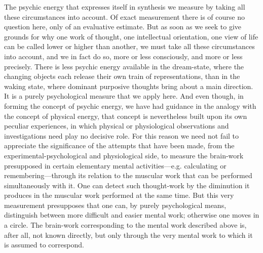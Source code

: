 \documentclass[12pt,a4paper]{book}
\newcommand{\opage}[1]{\marginnote{\footnotesize\textit{[#1]}}}
\begin{document}
The psychic energy that expresses itself in synthesis we measure by
taking all these circumstances into account. Of exact measurement there
is of course no question here, only of an evaluative estimate. But as
soon as we seek to give grounds for why one work of thought, one
intellectual orientation, one view of life can be called lower or higher
than another, we must take all these circumstances into account, and we
in fact do so, more or less consciously, and more or less precisely.
There is less psychic energy available in the dream-state, where the
changing objects each release their own train of representations, than
in the waking state, where dominant purposive thoughts bring about a
main direction. It is a purely psychological measure that we apply here.
And even though, in forming the concept of psychic energy, we have had
guidance in the analogy with the concept of physical energy, that
concept is nevertheless built upon its own peculiar experiences, in
which physical or physiological observations and investigations need
play no decisive role. For this reason we need not fail to appreciate
the significance of the attempts that have been made, from the
experimental-psychological and physiological side, to measure the
brain-work presupposed in certain elementary mental activities---e.g.
calculating or remembering---through its relation to the muscular work
that can be performed simultaneously with it. One can detect such
thought-work by the diminution it produces in the muscular work
performed at the same time. But this very measurement presupposes that
one can, by purely psychological means, distinguish between more
difficult and easier mental work; otherwise one moves in a circle. The
brain-work corresponding to the mental work described above is, after
all, not known directly, but \opage{7}only through the very mental work to which
it is assumed to correspond.
\end{document}
